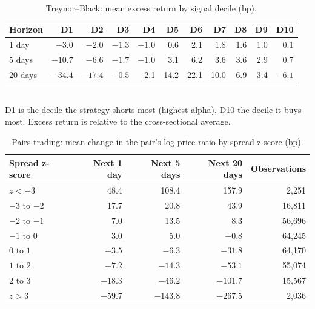 \documentclass[11pt]{article}
\begin{document}
\begin{table}[H]
\centering
\caption{Treynor--Black: mean excess return by signal decile (bp).}
\label{tab:calibration-tb}
\begin{tabular}{lrrrrrrrrrr}
\toprule
Horizon & D1 & D2 & D3 & D4 & D5 & D6 & D7 & D8 & D9 & D10 \\
\midrule
1 day & $-3.0$ & $-2.0$ & $-1.3$ & $-1.0$ & 0.6 & 2.1 & 1.8 & 1.6 & 1.0 & 0.1 \\
5 days & $-10.7$ & $-6.6$ & $-1.7$ & $-1.0$ & 3.1 & 6.2 & 3.6 & 3.6 & 2.9 & 0.7 \\
20 days & $-34.4$ & $-17.4$ & $-0.5$ & 2.1 & 14.2 & 22.1 & 10.0 & 6.9 & 3.4 & $-6.1$ \\
\bottomrule
\end{tabular}
\\[4pt]
\small D1 is the decile the strategy shorts most (highest alpha), D10 the decile it buys most. Excess return is relative to the cross-sectional average.
\end{table}

\begin{table}[H]
\centering
\caption{Pairs trading: mean change in the pair's log price ratio by spread z-score (bp).}
\label{tab:calibration-pairs}
\begin{tabular}{lrrrr}
\toprule
Spread z-score & Next 1 day & Next 5 days & Next 20 days & Observations \\
\midrule
$z < -3$ & 48.4 & 108.4 & 157.9 & 2,251 \\
$-3$ to $-2$ & 17.7 & 20.8 & 43.9 & 16,811 \\
$-2$ to $-1$ & 7.0 & 13.5 & 8.3 & 56,696 \\
$-1$ to $0$ & 3.0 & 5.0 & $-0.8$ & 64,245 \\
$0$ to $1$ & $-3.5$ & $-6.3$ & $-31.8$ & 64,170 \\
$1$ to $2$ & $-7.2$ & $-14.3$ & $-53.1$ & 55,074 \\
$2$ to $3$ & $-18.3$ & $-46.2$ & $-101.7$ & 15,567 \\
$z > 3$ & $-59.7$ & $-143.8$ & $-267.5$ & 2,036 \\
\bottomrule
\end{tabular}
\end{table}
\end{document}
